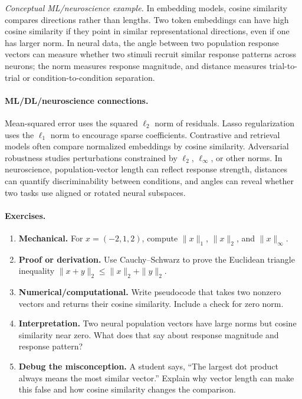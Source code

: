 \emph{Conceptual ML/neuroscience example.} In embedding models, cosine similarity compares directions rather than lengths. Two token embeddings can have high cosine similarity if they point in similar representational directions, even if one has larger norm. In neural data, the angle between two population response vectors can measure whether two stimuli recruit similar response patterns across neurons; the norm measures response magnitude, and distance measures trial-to-trial or condition-to-condition separation.

\paragraph{ML/DL/neuroscience connections.}
Mean-squared error uses the squared \(\ell_2\) norm of residuals. Lasso regularization uses the \(\ell_1\) norm to encourage sparse coefficients. Contrastive and retrieval models often compare normalized embeddings by cosine similarity. Adversarial robustness studies perturbations constrained by \(\ell_2\), \(\ell_\infty\), or other norms. In neuroscience, population-vector length can reflect response strength, distances can quantify discriminability between conditions, and angles can reveal whether two tasks use aligned or rotated neural subspaces.

\paragraph{Exercises.}
\begin{enumerate}[label=\textbf{3.3.\arabic*.}, leftmargin=*]
\item \textbf{Mechanical.} For \(x=(-2,1,2)\), compute \(\|x\|_1\), \(\|x\|_2\), and \(\|x\|_\infty\).
\item \textbf{Proof or derivation.} Use Cauchy--Schwarz to prove the Euclidean triangle inequality \(\|x+y\|_2\le \|x\|_2+\|y\|_2\).
\item \textbf{Numerical/computational.} Write pseudocode that takes two nonzero vectors and returns their cosine similarity. Include a check for zero norm.
\item \textbf{Interpretation.} Two neural population vectors have large norms but cosine similarity near zero. What does that say about response magnitude and response pattern?
\item \textbf{Debug the misconception.} A student says, ``The largest dot product always means the most similar vector.'' Explain why vector length can make this false and how cosine similarity changes the comparison.
\end{enumerate}

